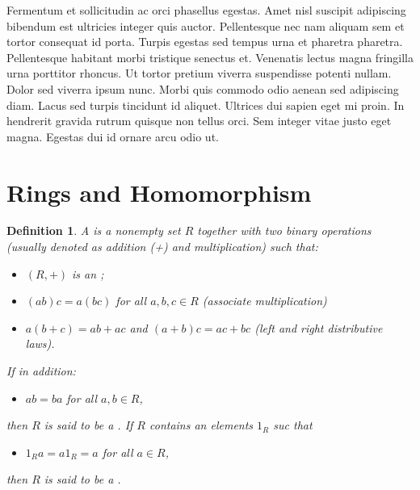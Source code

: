 \documentclass[a4paper]{article}
\newtheorem{definition}{Definition}[section]
\begin{document}
Fermentum et sollicitudin ac orci phasellus egestas. Amet nisl suscipit adipiscing bibendum est ultricies integer quis auctor. Pellentesque nec nam aliquam sem et tortor consequat id porta. Turpis egestas sed tempus urna et pharetra pharetra. Pellentesque habitant morbi tristique senectus et. Venenatis lectus magna fringilla urna porttitor rhoncus. Ut tortor pretium viverra suspendisse potenti nullam. Dolor sed viverra ipsum nunc. Morbi quis commodo odio aenean sed adipiscing diam. Lacus sed turpis tincidunt id aliquet. Ultrices dui sapien eget mi proin. In hendrerit gravida rutrum quisque non tellus orci. Sem integer vitae justo eget magna. Egestas dui id ornare arcu odio ut.

\section{Rings and Homomorphism}

\begin{definition}
  A  is a nonempty set $R$
  together with two binary operations (usually denoted as addition (+) and multiplication) such that:
  \begin{itemize}
    \item $(R, +)$ is an  ;
    \item $(ab)c = a(bc)$ for all $a, b, c \in R$ (associate multiplication)
    \item $a(b + c) = ab + ac$ and $(a+b)c = ac + bc$
      (left and right distributive laws).
  \end{itemize}

  If in addition:
  \begin{itemize}
    \item $ab = ba$ for all $a, b \in R$,
  \end{itemize}

  then $R$ is said to be a .
  If $R$ contains an elements $1_R$ suc that
  \begin{itemize}
    \item $1_R a = a 1_R = a$ for all $a \in R$,
  \end{itemize}

  then $R$ is said to be a .
\end{definition}



\end{document}
